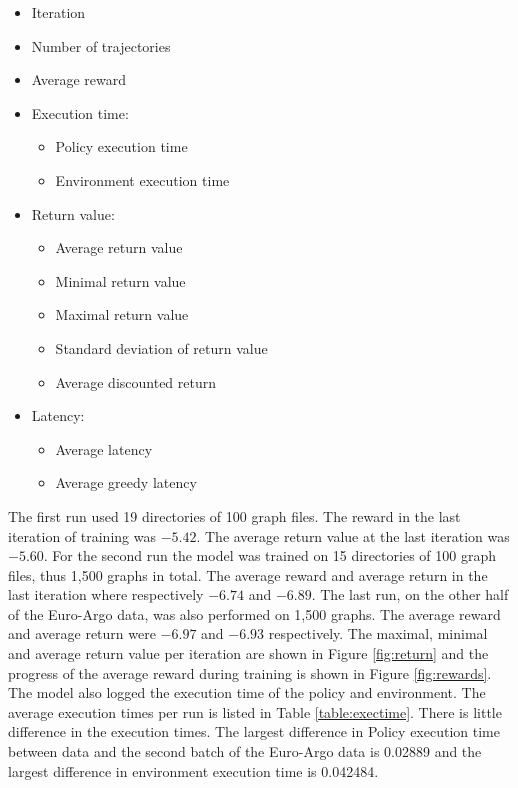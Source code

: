 \begin{itemize}[noitemsep]
    \item Iteration
    \item Number of trajectories
    \item Average reward
    \item Execution time:
        \begin{itemize}[noitemsep]
            \item Policy execution time
            \item Environment execution time
        \end{itemize}
    \item Return value:
        \begin{itemize}[noitemsep]
            \item Average return value
            \item Minimal return value
            \item Maximal return value
            \item Standard deviation of return value
            \item Average discounted return
        \end{itemize}
    \item Latency:
        \begin{itemize}[noitemsep]
            \item Average latency
            \item Average greedy latency
        \end{itemize}
\end{itemize}



The first run used 19 directories of 100 graph files. The reward in the last
iteration of training was $-5.42$. The average return value at the last
iteration was $-5.60$. For the second run the model was trained on 15
directories of 100 graph files, thus 1,500 graphs in total. The average reward
and average return in the last iteration where respectively $-6.74$ and
$-6.89$. The last run, on the other half of the Euro-Argo data, was also
performed on 1,500 graphs. The average reward and average return were $-6.97$
and $-6.93$ respectively. The maximal, minimal and average return value per
iteration are shown in Figure \ref{fig:return} and the progress of the average
reward during training is shown in Figure \ref{fig:rewards}. The model also
logged the execution time of the policy and environment. The average execution
times per run is listed in Table \ref{table:exectime}. There is little
difference in the execution times. The largest difference in Policy execution time
between \mrlco data and the second batch of the Euro-Argo data is 0.02889 and
the largest difference in environment execution time is 0.042484.

